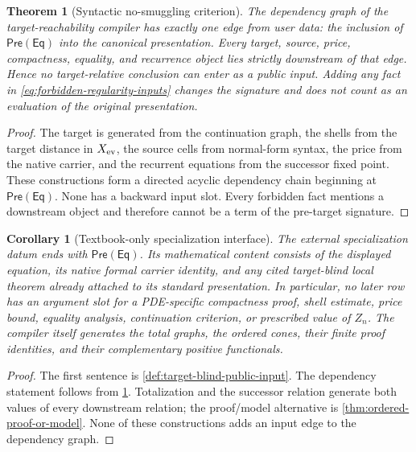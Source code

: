 \documentclass[11pt]{article}
\numberwithin{section}{part}
\theoremstyle{plain}
\newtheorem{theorem}{Theorem}[section]
\newtheorem{corollary}[corollary]{Corollary}
\theoremstyle{definition}
\theoremstyle{remark}
\begin{document}
\begin{theorem}[Syntactic no-smuggling criterion]
\label{thm:syntactic-no-smuggling}
The dependency graph of the target-reachability compiler has exactly one edge
from user data: the inclusion of
\(\mathsf{Pre}(\mathsf{Eq})\) into the canonical presentation.  Every target,
source, price, compactness, equality, and recurrence object lies strictly
downstream of that edge.  Hence no target-relative conclusion can enter as a
public input.  Adding any fact in
\eqref{eq:forbidden-regularity-inputs} changes the signature and does not count
as an evaluation of the original presentation.
\end{theorem}

\begin{proof}
The target is generated from the continuation graph, the shells from the
target distance in \(X_{\rm ev}\), the source cells from normal-form syntax,
the price from the native carrier, and the recurrent equations from the
successor fixed point.  These constructions form a directed acyclic
dependency chain beginning at \(\mathsf{Pre}(\mathsf{Eq})\).  None has a
backward input slot.  Every forbidden fact mentions a downstream object and
therefore cannot be a term of the pre-target signature.
\end{proof}

\begin{corollary}[Textbook-only specialization interface]
\label{cor:textbook-only-specialization}
The external specialization datum ends with
\(\mathsf{Pre}(\mathsf{Eq})\).  Its mathematical content consists of the
displayed equation, its native formal carrier identity, and any cited
target-blind local theorem already attached to its standard presentation.
In particular, no later
row has an argument slot for a PDE-specific compactness proof, shell estimate,
price bound, equality analysis, continuation criterion, or prescribed value
of \(Z_n\).  The compiler itself generates the total graphs, the ordered cones,
their finite proof identities, and their complementary positive functionals.
\end{corollary}

\begin{proof}
The first sentence is \cref{def:target-blind-public-input}.  The dependency
statement follows from \cref{thm:syntactic-no-smuggling}.  Totalization and
the successor relation generate both values of every downstream relation;
the proof/model alternative is
\cref{thm:ordered-proof-or-model}.  None of these constructions
adds an input edge to the dependency graph.
\end{proof}
\end{document}
